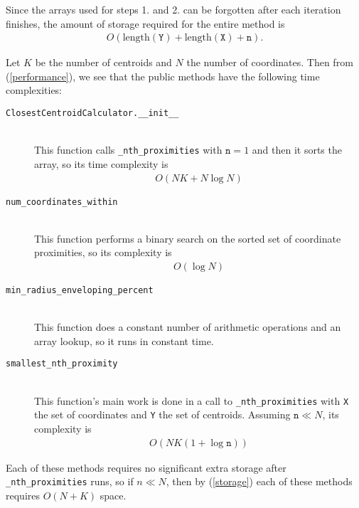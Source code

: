 \documentclass{amsart}
\theoremstyle{definition}
\theoremstyle{definition}
\begin{document}
Since the arrays used for steps 1. and 2. can be forgotten after each iteration finishes, the amount of storage required for the entire method is
\begin{align}
  O(\mbox{length}(\texttt{Y}) + \mbox{length}(\texttt{X}) + \texttt{n}). \label{storage}
\end{align}

Let $K$ be the number of centroids and $N$ the number of coordinates.  Then from (\ref{performance}), we see that the public methods have the following time complexities:
\begin{description}
\item[\texttt{ClosestCentroidCalculator.\_\_init\_\_}]\ \\
  This function calls \texttt{\_nth\_proximities} with $\texttt{n}=1$ and then it sorts the array, so its time complexity is
  \begin{align*}
    O(NK + N\log N)
  \end{align*}
\item[\texttt{num\_coordinates\_within}]\ \\
  This function performs a binary search on the sorted set of coordinate proximities, so its complexity is
  \begin{align*}O(\log N)\end{align*}
\item[\texttt{min\_radius\_enveloping\_percent}]\ \\
  This function does a constant number of arithmetic operations and an array lookup, so it runs in constant time.
\item[\texttt{smallest\_nth\_proximity}]\ \\
  This function's main work is done in a call to \texttt{\_nth\_proximities} with \texttt{X} the set of coordinates and \texttt{Y} the set of centroids.  Assuming $\texttt{n} \ll N$, its complexity is
  \begin{align*}O(NK(1+\log \texttt{n}))\end{align*}
\end{description}

Each of these methods requires no significant extra storage after \texttt{\_nth\_proximities} runs, so if $n \ll N$, then by (\ref{storage}) each of these methods requires $O(N+K)$ space.
\end{document}
